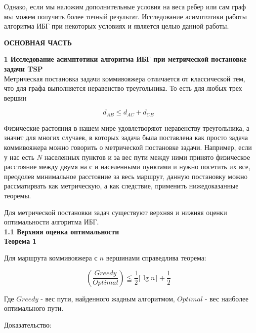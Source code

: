 \documentclass[a4paper, 14pt]{extarticle}
\begin{document}
Однако, если мы наложим дополнительные условия на веса ребер или сам граф мы можем получить более точный результат. Исследование асимптотики работы алгоритма ИБГ при некоторых условиях и является целью данной работы. \newline

\newpage

\begin{center}
 \textbf{ОСНОВНАЯ ЧАСТЬ}\\
\end{center}

\textbf{1 Исследование асимптотики алгоритма ИБГ при метрической постановке задачи TSP}\\

Метрическая постановка задачи коммивояжера отличается от классической тем, что для графа выполняется неравенство треугольника. То есть для любых трех вершин

\begin{equation}
d_{AB} \leq d_{AC} + d_{CB}
\end{equation}

Физические растояния в нашем мире удовлетворяют неравенству треугольника, а значит для многих случаев, в которых задача была поставлена как просто задача коммивояжера можно говорить о метрической постановке задачи. Например, если у нас есть $N$ населенных пунктов и за вес пути между ними принято физическое расстояние между двумя на с и населенными пунктами и нужно посетить их все, преодолев минимальное расстояние за весь маршрут, данную постановку можно рассматирвать как метрическую, а как следствие, применить нижедоказанные теоремы.

Для метрической постановки задач существуют верхняя и нижняя оценки оптимальности алгоритма ИБГ. \\


\textbf{1.1 Верхняя оценка оптимальности}\\

\textbf{Теорема 1}

Для маршрута коммивояжера с $n$ вершинами справедлива теорема:

\begin{equation}
	(\frac{Greedy}{Optimal}) \leqq \frac{1}{2}\lceil{\lg n}\rceil + \frac{1}{2}
\end{equation}

Где $Greedy$ - вес пути, найденного жадным алгоритмом, $Optimal$ - вес наиболее оптимального пути.

Доказательство:
\end{document}
